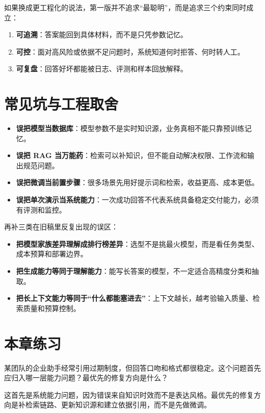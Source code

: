 如果换成更工程化的说法，第一版并不追求“最聪明”，而是追求三个约束同时成立：
\begin{enumerate}
  \item \textbf{可追溯}：答案能回到具体材料，而不是只凭参数记忆。
  \item \textbf{可控}：面对高风险或依据不足问题时，系统知道何时拒答、何时转人工。
  \item \textbf{可复盘}：回答好坏都能被日志、评测和样本回放解释。
\end{enumerate}

\section{常见坑与工程取舍}
\begin{itemize}
  \item \textbf{误把模型当数据库}：模型参数不是实时知识源，业务真相不能只靠预训练记忆。
  \item \textbf{误把 RAG 当万能药}：检索可以补知识，但不能自动解决权限、工作流和输出规范问题。
  \item \textbf{误把微调当前置步骤}：很多场景先用好提示词和检索，收益更高、成本更低。
  \item \textbf{误把单次演示当系统能力}：一次成功回答不代表系统具备稳定交付能力，必须有评测和监控。
\end{itemize}

再补三类在旧稿里反复出现的误区：
\begin{itemize}
  \item \textbf{把模型家族差异理解成排行榜差异}：选型不是挑最火模型，而是看任务类型、成本预算和部署边界。
  \item \textbf{把生成能力等同于理解能力}：能写长答案的模型，不一定适合高精度分类和抽取。
  \item \textbf{把长上下文能力等同于“什么都能塞进去”}：上下文越长，越考验输入质量、检索质量和预算控制。
\end{itemize}

\section{本章练习}
\begin{exercise}[能力分层判断]
某团队的企业助手经常引用过期制度，但回答口吻和格式都很稳定。这个问题首先应归入哪一层能力问题？最优先的修复方向是什么？
\end{exercise}

\begin{solution}
这首先是{\heiti 系统能力问题}，因为错误来自知识时效而不是表达风格。最优先的修复方向是补检索链路、更新知识源和建立依据引用，而不是先做微调。
\end{solution}

